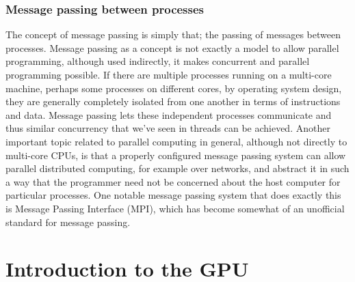 \documentclass[a4paper,11pt]{article}
\begin{document}
\subsubsection{Message passing between processes} %
\label{ssub:message_passing_between_processes}
The concept of message passing is simply that; the passing of messages between processes. Message passing as a concept is
not exactly a model to allow parallel programming, although used indirectly, it makes concurrent and parallel programming
possible. If there are multiple processes running on a multi-core machine, perhaps some processes on different cores, by
operating system design, they are generally completely isolated from one another in terms of instructions and data. Message
passing lets these independent processes communicate and thus similar concurrency that we've seen in threads can be achieved.
Another important topic related to parallel computing in general, although not directly to multi-core CPUs, is that a
properly configured message passing system can allow parallel distributed computing, for example over networks, and abstract
it in such a way that the programmer need not be concerned about the host computer for particular processes. One notable
message passing system that does exactly this is Message Passing Interface (MPI), which has become somewhat of an unofficial
standard for message passing.




\newpage


\section{Introduction to the GPU} %
\label{sec:introduction_to_the_gpu}
\end{document}
